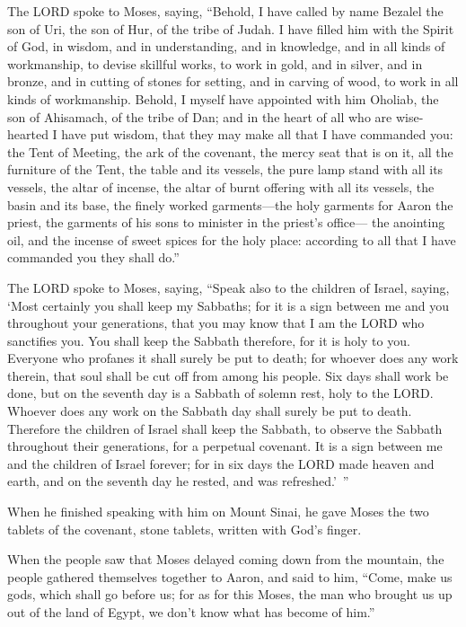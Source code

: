 \mychapter{} \myverse*{}The LORD spoke to Moses, saying,
\myverse{}“Behold, I have called by name Bezalel the son of Uri, the son of Hur, of the
tribe of Judah.
\myverse{}I have filled him with the Spirit of God, in wisdom, and in understanding,
and in knowledge, and in all kinds of workmanship,
\myverse{}to devise skillful works, to work in gold, and in silver, and in bronze,
\myverse{}and in cutting of stones for setting, and in carving of wood, to work in all
kinds of workmanship.
\myverse{}Behold, I myself have appointed with him Oholiab, the son of Ahisamach, of
the tribe of Dan; and in the heart of all who are wise-hearted I have put wisdom, that they may make all
that I have commanded you:
\myverse{}the Tent of Meeting, the ark of the covenant, the mercy seat that is on it,
all the furniture of the Tent,
\myverse{}the table and its vessels, the pure lamp stand with all its vessels, the altar
of incense,
\myverse{}the altar of burnt offering with all its vessels, the basin and its base,
\myverse{}the finely worked garments—the holy garments for Aaron the priest, the garments
of his sons to minister in the priest’s office—
\myverse{}the anointing oil, and the incense of sweet spices for the holy place: according
to all that I have commanded you they shall do.”


\myverse{}The LORD spoke to Moses, saying,
\myverse{}“Speak also to the children of Israel, saying, ‘Most certainly you shall
keep my Sabbaths; for it is a sign between me and you throughout your generations, that you may know that
I am the LORD who sanctifies you.
\myverse{}You shall keep the Sabbath therefore, for it is holy to you. Everyone who
profanes it shall surely be put to death; for whoever does any work therein, that soul shall be cut off
from among his people.
\myverse{}Six days shall work be done, but on the seventh day is a Sabbath of solemn
rest, holy to the LORD. Whoever does any work on the Sabbath day shall surely be put to death.
\myverse{}Therefore the children of Israel shall keep the Sabbath, to observe the Sabbath
throughout their generations, for a perpetual covenant.
\myverse{}It is a sign between me and the children of Israel forever; for in six days
the LORD made heaven and earth, and on the seventh day he rested, and was refreshed.’ ”


\myverse{}When he finished speaking with him on Mount Sinai, he gave Moses
the two tablets of the covenant, stone tablets, written with God’s finger.


\mychapter{} \myverse*{}When the people saw that Moses delayed coming down from the mountain,
the people gathered themselves together to Aaron, and said to him, “Come, make us gods, which shall go
before us; for as for this Moses, the man who brought us up out of the land of Egypt, we don’t know what
has become of him.”


